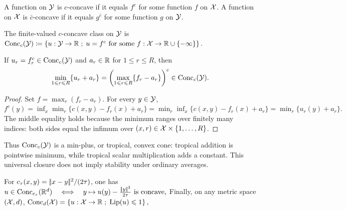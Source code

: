 \begin{defn}\label{def-c-concave-functions}
A function on $\mathcal{Y}$ is $c$-concave if it equals $f^c$ for some function $f$ on $\mathcal{X}$. A function on $\mathcal{X}$ is $\bar c$-concave if it equals $g^{\bar c}$ for some function $g$ on $\mathcal{Y}$.
\end{defn}
\begin{defn}\label{def-finite-c-concave-class}
The finite-valued $c$-concave class on $\mathcal{Y}$ is \(\operatorname{Conc}_c(\mathcal{Y}) \coloneqq \left\{ u:\mathcal{Y}\to\mathbb{R} \;;\; u=f^c\text{ for some }f:\mathcal{X}\to\mathbb{R}\cup\{-\infty\} \right\}.\)
\end{defn}
\begin{prop}\label{prop-c-concave-tropical-barycenter}
If $u_r=f_r^c\in\operatorname{Conc}_c(\mathcal{Y})$ and $a_r\in\mathbb{R}$ for $1\leq r\leq R$, then
\[
\min_{1\leqslant r\leqslant R}\{u_r+a_r\}
=
\left(\max_{1\leqslant r\leqslant R}\{f_r-a_r\}\right)^c
\in\operatorname{Conc}_c(\mathcal{Y}).
\]
\end{prop}
\begin{proof}
Set $f=\max_r(f_r-a_r)$. For every $y\in\mathcal{Y}$, \(f^c(y) = \inf_x\min_r\{c(x,y)-f_r(x)+a_r\} = \min_r\inf_x\{c(x,y)-f_r(x)+a_r\} = \min_r\{u_r(y)+a_r\}.\)
The middle equality holds because the minimum ranges over finitely many indices: both sides equal the infimum over $(x,r)\in\mathcal{X}\times\{1,\ldots,R\}$.
\end{proof}
Thus $\operatorname{Conc}_c(\mathcal{Y})$ is a min-plus, or tropical, convex cone: tropical addition is pointwise minimum, while tropical scalar multiplication adds a constant. This universal closure does not imply stability under ordinary averages.

For $c_\tau(x,y)=|\!| x-y |\!|^2/(2\tau)$, one has \(u\in\operatorname{Conc}_{c_\tau}(\mathbb{R}^d) \quad\Longleftrightarrow\quad y\mapsto u(y)-\frac{|\!| y |\!|^2}{2\tau}\text{ is concave},\)
Finally, on any metric space $(\mathcal{X},d)$, \(\operatorname{Conc}_d(\mathcal{X})=\left\{ u:\mathcal{X}\to\mathbb{R} \;;\; \operatorname{Lip}(u)\leqslant1 \right\},\)
